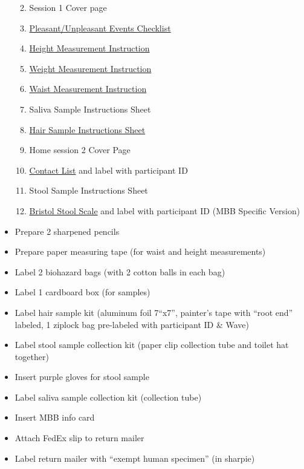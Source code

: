\documentclass[]{book}
\providecommand{\tightlist}{%
  \setlength{\itemsep}{0pt}\setlength{\parskip}{0pt}}
\begin{document}
\begin{itemize}
  \begin{enumerate}
  \def\labelenumi{\arabic{enumi}.}
  \tightlist
  \item
    Session 1 Cover page
  \item
    \href{https://ucla.app.box.com/file/630327764749}{Pleasant/Unpleasant Events Checklist}
  \item
    \href{https://ucla.app.box.com/file/689385482411}{Height Measurement Instruction}
  \item
    \href{https://ucla.app.box.com/file/689387417719}{Weight Measurement Instruction}
  \item
    \href{https://ucla.app.box.com/file/689387420907}{Waist Measurement Instruction}
  \item
    Saliva Sample Instructions Sheet
  \item
    \href{https://ucla.app.box.com/file/685938821891}{Hair Sample Instructions Sheet}
  \item
    Home session 2 Cover Page
  \item
    \href{https://ucla.app.box.com/file/639652767665}{Contact List} and label with participant ID
  \item
    Stool Sample Instructions Sheet
  \item
    \href{https://app.box.com/file/630326499609}{Bristol Stool Scale} and label with participant ID (MBB Specific Version)
  \end{enumerate}
\item
  Prepare 2 sharpened pencils
\item
  Prepare paper measuring tape (for waist and height measurements)
\item
  Label 2 biohazard bags (with 2 cotton balls in each bag)
\item
  Label 1 cardboard box (for samples)
\item
  Label hair sample kit (aluminum foil 7``x7'', painter's tape with ``root end'' labeled, 1 ziplock bag pre-labeled with participant ID \& Wave)
\item
  Label stool sample collection kit (paper clip collection tube and toilet hat together)
\item
  Insert purple gloves for stool sample
\item
  Label saliva sample collection kit (collection tube)
\item
  Insert MBB info card
\item
  Attach FedEx slip to return mailer
\item
  Label return mailer with ``exempt human specimen'' (in sharpie)

\end{itemize}
\end{document}
